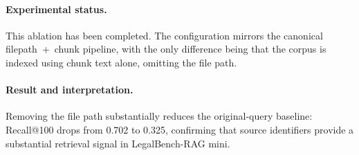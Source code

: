 \documentclass[a4paper,fleqn]{cas-dc}
\begin{document}
\paragraph{Experimental status.}
This ablation has been completed. The configuration
mirrors the canonical filepath~+~chunk pipeline, with
the only difference being that the corpus is indexed
using chunk text alone, omitting the file path.
\begin{table}[h]
\centering
\caption{Filepath~+~chunk versus chunk-only indexing
on LegalBench-RAG mini. $\dagger$: significant gain
after Holm correction. $\downarrow$: significant
deterioration after Holm correction. {--}:
non-significant. Harm rate reported for Recall@100.}
\label{tab:ablation-filepath}
\end{table}
\paragraph{Result and interpretation.}
Removing the file path substantially reduces the
original-query baseline: Recall@100 drops from 0.702
to 0.325, confirming that source identifiers provide a
substantial retrieval signal in LegalBench-RAG mini.
\end{document}
